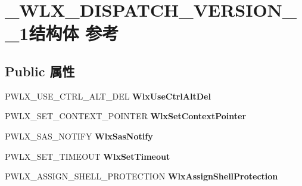 \hypertarget{struct___w_l_x___d_i_s_p_a_t_c_h___v_e_r_s_i_o_n__1__1}{}\section{\+\_\+\+W\+L\+X\+\_\+\+D\+I\+S\+P\+A\+T\+C\+H\+\_\+\+V\+E\+R\+S\+I\+O\+N\+\_\+\_\+1结构体 参考}
\label{struct___w_l_x___d_i_s_p_a_t_c_h___v_e_r_s_i_o_n__1__1}
\subsection*{Public 属性}
\begin{DoxyCompactItemize}
\item 
\mbox{\label{struct___w_l_x___d_i_s_p_a_t_c_h___v_e_r_s_i_o_n__1__1_a84a89ee8e814895c0d9066a1bc87c4ea}} 
P\+W\+L\+X\+\_\+\+U\+S\+E\+\_\+\+C\+T\+R\+L\+\_\+\+A\+L\+T\+\_\+\+D\+EL {\bfseries Wlx\+Use\+Ctrl\+Alt\+Del}
\item 
\mbox{\label{struct___w_l_x___d_i_s_p_a_t_c_h___v_e_r_s_i_o_n__1__1_aaca64155128487e2f3a81d42a5df6fe0}} 
P\+W\+L\+X\+\_\+\+S\+E\+T\+\_\+\+C\+O\+N\+T\+E\+X\+T\+\_\+\+P\+O\+I\+N\+T\+ER {\bfseries Wlx\+Set\+Context\+Pointer}
\item 
\mbox{\label{struct___w_l_x___d_i_s_p_a_t_c_h___v_e_r_s_i_o_n__1__1_a5332f3c59952ffa36fe97bfa25fca0c9}} 
P\+W\+L\+X\+\_\+\+S\+A\+S\+\_\+\+N\+O\+T\+I\+FY {\bfseries Wlx\+Sas\+Notify}
\item 
\mbox{\label{struct___w_l_x___d_i_s_p_a_t_c_h___v_e_r_s_i_o_n__1__1_a3c9875634315924c679abaecbe5f1aa7}} 
P\+W\+L\+X\+\_\+\+S\+E\+T\+\_\+\+T\+I\+M\+E\+O\+UT {\bfseries Wlx\+Set\+Timeout}
\item 
\mbox{\label{struct___w_l_x___d_i_s_p_a_t_c_h___v_e_r_s_i_o_n__1__1_a7d595afa60303dd334fcc8574feb8c71}} 
P\+W\+L\+X\+\_\+\+A\+S\+S\+I\+G\+N\+\_\+\+S\+H\+E\+L\+L\+\_\+\+P\+R\+O\+T\+E\+C\+T\+I\+ON {\bfseries Wlx\+Assign\+Shell\+Protection}

\end{DoxyCompactItemize}
